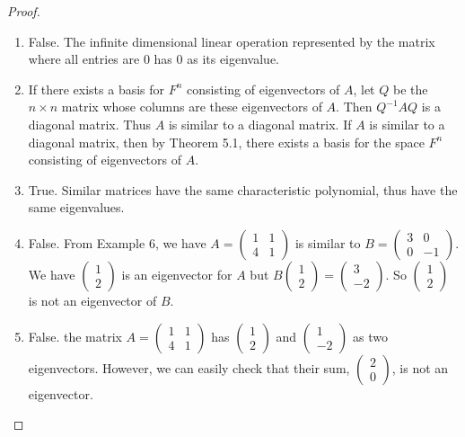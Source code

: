 \documentclass[12pt, a4paper]{article}
\theoremstyle{plain}
\begin{document}
\begin{proof}
\begin{enumerate}[label=(\alph*)]
    \item False. The infinite dimensional linear operation represented by the matrix where all entries are $0$ has $0$ as its eigenvalue.
    
    \item If there exists a basis for $F^n$ consisting of eigenvectors of $A$, let $Q$ be the $n\times n$ matrix whose columns are these eigenvectors of $A$. Then $Q^{-1}AQ$ is a diagonal matrix. Thus $A$ is similar to a diagonal matrix. If $A$ is similar to a diagonal matrix, then by Theorem 5.1, there exists a basis for the space $F^n$ consisting of eigenvectors of $A$.
    
    \item True. Similar matrices have the same characteristic polynomial, thus have the same eigenvalues.
    
    \item False. From Example 6, we have $A=\begin{pmatrix}
    1&1\\
    4&1
    \end{pmatrix}$ is similar to $B=\begin{pmatrix}
    3&0\\
    0&-1
    \end{pmatrix}$. We have $\begin{pmatrix}
    1\\
    2
    \end{pmatrix}$ is an eigenvector for $A$ but $B\begin{pmatrix}
    1\\
    2
    \end{pmatrix}=\begin{pmatrix}
    3\\
    -2
    \end{pmatrix}$. So $\begin{pmatrix}
    1\\
    2
    \end{pmatrix}$ is not an eigenvector of $B$.
    
    \item False. the matrix $A=\begin{pmatrix}
    1&1\\
    4&1
    \end{pmatrix}$ has $\begin{pmatrix}
    1\\
    2
    \end{pmatrix}$ and $\begin{pmatrix}
    1\\
    -2
    \end{pmatrix}$ as two eigenvectors. However, we can easily check that their sum, $\begin{pmatrix}
    2\\
    0
    \end{pmatrix}$, is not an eigenvector.
    
    
\end{enumerate}
\end{proof}
\end{document}
